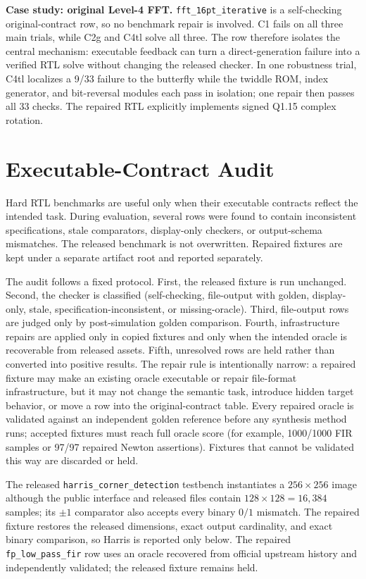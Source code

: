 \documentclass[sigconf,anonymous]{acmart}
\newcommand{\cOne}{C1\xspace}
\newcommand{\cTwoG}{C2g\xspace}
\newcommand{\cFourTL}{C4tl\xspace}
\begin{document}
\textbf{Case study: original Level-4 FFT.}
\texttt{fft\_16pt\_iterative} is a self-checking original-contract row, so no benchmark repair is involved.
\cOne fails on all three main trials, while \cTwoG and \cFourTL solve all three.
The row therefore isolates the central mechanism: executable feedback can turn a direct-generation failure into a verified RTL solve without changing the released checker.
In one robustness trial, \cFourTL localizes a 9/33 failure to the butterfly while the twiddle ROM, index generator, and bit-reversal modules each pass in isolation; one repair then passes all 33 checks.
The repaired RTL explicitly implements signed Q1.15 complex rotation.

\section{Executable-Contract Audit}

Hard RTL benchmarks are useful only when their executable contracts reflect the intended task.
During evaluation, several rows were found to contain inconsistent specifications, stale comparators, display-only checkers, or output-schema mismatches.
The released benchmark is not overwritten.
Repaired fixtures are kept under a separate artifact root and reported separately.

The audit follows a fixed protocol.
First, the released fixture is run unchanged.
Second, the checker is classified (self-checking, file-output with golden, display-only, stale, specification-inconsistent, or missing-oracle).
Third, file-output rows are judged only by post-simulation golden comparison.
Fourth, infrastructure repairs are applied only in copied fixtures and only when the intended oracle is recoverable from released assets.
Fifth, unresolved rows are held rather than converted into positive results.
The repair rule is intentionally narrow: a repaired fixture may make an existing oracle executable or repair file-format infrastructure, but it may not change the semantic task, introduce hidden target behavior, or move a row into the original-contract table.
Every repaired oracle is validated against an independent golden reference before any synthesis method runs; accepted fixtures must reach full oracle score (for example, 1000/1000 FIR samples or 97/97 repaired Newton assertions).
Fixtures that cannot be validated this way are discarded or held.

The released \texttt{harris\_corner\_detection} testbench instantiates a $256\times256$ image although the public interface and released files contain $128\times128=16{,}384$ samples; its $\pm1$ comparator also accepts every binary $0/1$ mismatch.
The repaired fixture restores the released dimensions, exact output cardinality, and exact binary comparison, so Harris is reported only below.
The repaired \texttt{fp\_low\_pass\_fir} row uses an oracle recovered from official upstream history and independently validated; the released fixture remains held.
\end{document}
